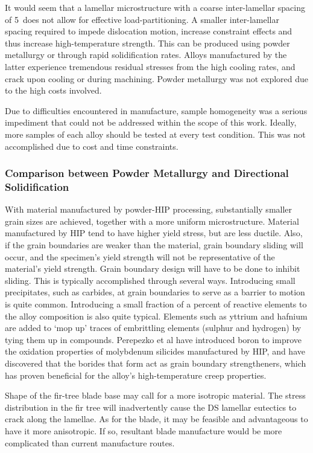 It would seem that a lamellar microstructure with a coarse inter-lamellar spacing of 5\micro\metre\ does not allow for effective load-partitioning.  A smaller inter-lamellar spacing required to impede dislocation motion, increase constraint effects and thus increase high-temperature strength.  This can be produced using powder metallurgy or through rapid solidification rates.  Alloys manufactured by the latter experience tremendous residual stresses from the high cooling rates, and crack upon cooling or during machining.  Powder metallurgy was not explored due to the high costs involved.

Due to difficulties encountered in manufacture, sample homogeneity was a serious impediment that could not be addressed within the scope of this work.  Ideally, more samples of each alloy should be tested at every test condition.  This was not accomplished due to cost and time constraints.


\subsubsection{Comparison between Powder Metallurgy and Directional Solidification}

With material manufactured by powder-HIP processing, substantially smaller grain sizes are achieved, together with a more uniform microstructure.  Material manufactured by HIP tend to have higher yield stress, but are less ductile.  Also, if the grain boundaries are weaker than the material, grain boundary sliding will occur, and the specimen’s yield strength will not be representative of the material’s yield strength.  Grain boundary design will have to be done to inhibit sliding.  This is typically accomplished through several ways.  Introducing small precipitates, such as carbides, at grain boundaries to serve as a barrier to motion is quite common.  Introducing a small fraction of a percent of reactive elements to the alloy composition is also quite typical.  Elements such as yttrium and hafnium are added to ‘mop up’ traces of embrittling elements (sulphur and hydrogen) by tying them up in compounds.  Perepezko et al have introduced boron to improve the oxidation properties of molybdenum silicides manufactured by HIP, and have discovered that the borides that form act as grain boundary strengtheners, which has proven beneficial for the alloy’s high-temperature creep properties.

Shape of the fir-tree blade base may call for a more isotropic material.  The stress distribution in the fir tree will inadvertently cause the DS lamellar eutectics to crack along the lamellae.  As for the blade, it may be feasible and advantageous to have it more anisotropic.  If so, resultant blade manufacture would be more complicated than current manufacture routes. 

